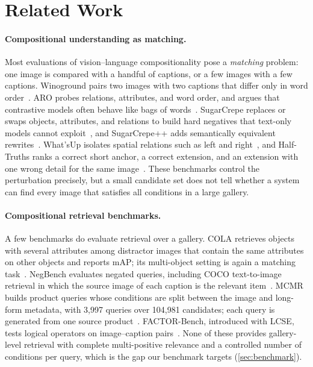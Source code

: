 \section{Related Work}
\label{sec:related}

\paragraph{Compositional understanding as matching.}
Most evaluations of vision--language compositionality pose a \emph{matching} problem: one image is compared with a handful of captions, or a few images with a few captions.
Winoground pairs two images with two captions that differ only in word order~\cite{winoground2022}.
ARO probes relations, attributes, and word order, and argues that contrastive models often behave like bags of words~\cite{aro2023}.
SugarCrepe replaces or swaps objects, attributes, and relations to build hard negatives that text-only models cannot exploit~\cite{sugarcrepe2023}, and SugarCrepe++ adds semantically equivalent rewrites~\cite{sugarcrepepp2024}.
What'sUp isolates spatial relations such as left and right~\cite{whatsup2023}, and Half-Truths ranks a correct short anchor, a correct extension, and an extension with one wrong detail for the same image~\cite{halftruths2026}.
These benchmarks control the perturbation precisely, but a small candidate set does not tell whether a system can find every image that satisfies all conditions in a large gallery.

\paragraph{Compositional retrieval benchmarks.}
A few benchmarks do evaluate retrieval over a gallery.
COLA retrieves objects with several attributes among distractor images that contain the same attributes on other objects and reports mAP; its multi-object setting is again a matching task~\cite{cola2023}.
NegBench evaluates negated queries, including COCO text-to-image retrieval in which the source image of each caption is the relevant item~\cite{negbench2025}.
MCMR builds product queries whose conditions are split between the image and long-form metadata, with 3,997 queries over 104,981 candidates; each query is generated from one source product~\cite{mcmr2026}.
FACTOR-Bench, introduced with LCSE, tests logical operators on image--caption pairs~\cite{lcse2026}.
None of these provides gallery-level retrieval with complete multi-positive relevance and a controlled number of conditions per query, which is the gap our benchmark targets (\cref{sec:benchmark}).

